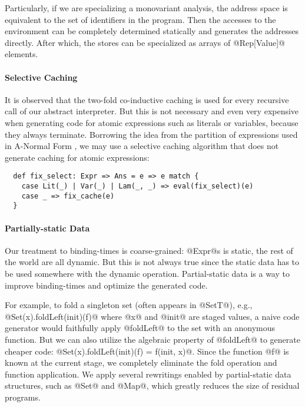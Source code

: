 Particularly, if we are specializing a monovariant analysis, the address space
is equivalent to the set of identifiers in the program. Then the accesses to the
environment can be completely determined statically and generates the addresses
directly. After which, the stores can be specialized as arrays of @Rep[Value]@
elements.

\paragraph{Selective Caching} It is observed that the two-fold co-inductive
caching is used for every recursive call of our abstract interpreter. But this
is not necessary and even very expensive when generating code for atomic
expressions such as literals or variables, because they always terminate.
Borrowing the idea from the partition of expressions used in A-Normal Form
\cite{Flanagan:1993:ECC:155090.155113}, we may use a selective caching
algorithm that does not generate caching for atomic expressions:
\begin{lstlisting}
  def fix_select: Expr => Ans = e => e match {
    case Lit(_) | Var(_) | Lam(_, _) => eval(fix_select)(e)
    case _ => fix_cache(e)
  }
\end{lstlisting}

\paragraph{Partially-static Data}

Our treatment to binding-times is coarse-grained: @Expr@s is static, the rest of
the world are all dynamic. But this is not always true since the static data
has to be used somewhere with the dynamic operation. Partial-static data is a
way to improve binding-times and optimize the generated code.

For example, to fold a singleton set (often appears in @SetT@), e.g.,
@Set(x).foldLeft(init)(f)@ where @x@ and @init@ are staged values, a naive code
generator would faithfully apply @foldLeft@ to the set with an anonymous
function. But we can also utilize the algebraic property of @foldLeft@ to
generate cheaper code: @Set(x).foldLeft(init)(f) = f(init, x)@. Since the
function @f@ is known at the current stage, we completely eliminate the fold
operation and function application. We apply several rewritings enabled by
partial-static data structures, such as @Set@ and @Map@, which greatly reduces
the size of residual programs.


